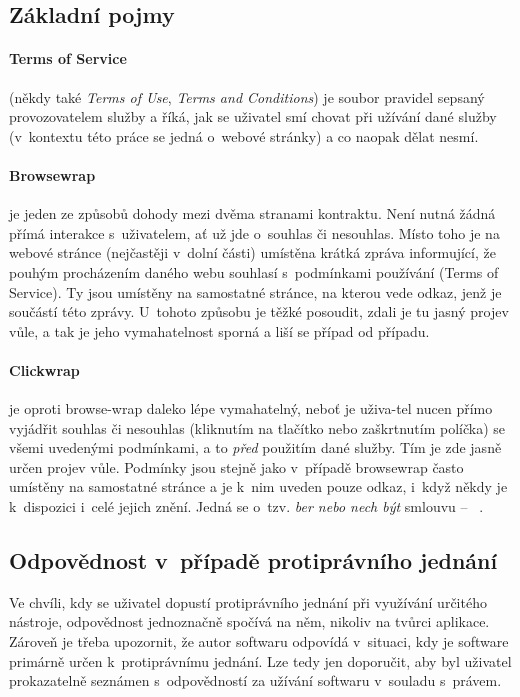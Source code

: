 \documentclass[thesis=B,czech]{FITthesis}[2012/06/26]
\begin{document}
\subsection{Základní pojmy}
\paragraph{Terms of Service} (někdy také \textit{Terms of Use}, \textit{Terms and Conditions}) je soubor pravidel sepsaný provozovatelem služby a říká, jak se uživatel smí chovat při užívání dané služby (v~kontextu této práce se jedná o~webové stránky) a co naopak dělat nesmí.

\paragraph{Browsewrap} je jeden ze způsobů dohody mezi dvěma stranami kontraktu. Není nutná žádná přímá interakce s~uživatelem, ať už jde o~souhlas či nesouhlas. Místo toho je na webové stránce (nejčastěji v~dolní části) umístěna krátká zpráva informující, že pouhým procházením daného webu souhlasí s~podmínkami používání (Terms of Service). Ty jsou umístěny na samostatné stránce, na kterou vede odkaz, jenž je součástí této zprávy. U~tohoto způsobu je těžké posoudit, zdali je tu jasný projev vůle, a tak je jeho vymahatelnost sporná a liší se případ od případu.~\cite{browse_wrap}

\paragraph{Clickwrap}\label{def:clickwrap} je oproti browse-wrap daleko lépe vymahatelný, neboť je uživa-tel nucen přímo vyjádřit souhlas či nesouhlas (kliknutím na tlačítko nebo zaškrtnutím políčka) se všemi uvedenými podmínkami, a to \emph{před} použitím dané služby. Tím je zde jasně určen projev vůle. Podmínky jsou stejně jako v~případě browsewrap často umístěny na samostatné stránce a je k~nim uveden pouze odkaz, i~když někdy je k~dispozici i~celé jejich znění. Jedná se o~tzv. \emph{ber nebo nech být} smlouvu -- ~\cite[překlad autora]{take_it_or_leave_it}.~\cite{click_wrap}

\subsection{Odpovědnost v~případě protiprávního jednání}
Ve chvíli, kdy se uživatel dopustí protiprávního jednání při využívání určitého nástroje, odpovědnost jednoznačně spočívá na něm, nikoliv na tvůrci aplikace. Zároveň je třeba upozornit, že autor softwaru odpovídá v~situaci, kdy je software primárně určen k~protiprávnímu jednání. Lze tedy jen doporučit, aby byl uživatel prokazatelně seznámen s~odpovědností za užívání softwaru v~souladu s~právem.~\cite{rozhovor}
\end{document}
